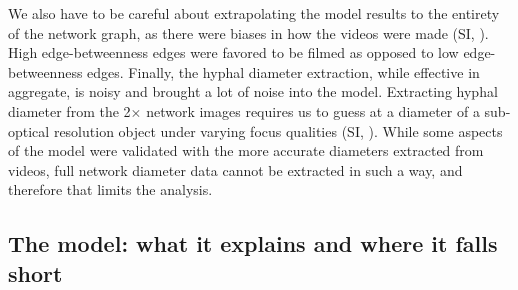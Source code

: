 We also have to be careful about extrapolating the model results to the entirety of the network graph, as there were biases in how the videos were made (SI, ).
High edge-betweenness edges were favored to be filmed as opposed to low edge-betweenness edges.
Finally, the hyphal diameter extraction, while effective in aggregate, is noisy and brought a lot of noise into the model.
Extracting hyphal diameter from the 2$\times$ network images requires us to guess at a diameter of a sub-optical resolution object under varying focus qualities (SI, ).
While some aspects of the model were validated with the more accurate diameters extracted from videos, full network diameter data cannot be extracted in such a way, and therefore that limits the analysis. 

\subsection*{The model: what it explains and where it falls short}

